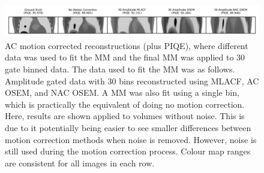             \begin{figure}
                \centering
                
                \includegraphics[width=1.0\linewidth]{figures/motion_correction_2_results_2_noiseless_30_amplitude_visual_analysis.png}
                
                \captionsetup{singlelinecheck=false}
                \caption{
                    \gls{AC} motion corrected reconstructions (plus \gls{PIQE}), where different data was used to fit the \gls{MM} and the final \gls{MM} was applied to $30$ gate binned data. The data used to fit the \gls{MM} was as follows. Amplitude gated data with $30$ bins reconstructed using \gls{MLACF}, \gls{AC} \gls{OSEM}, and \gls{NAC} \gls{OSEM}. A \gls{MM} was also fit using a single bin, which is practically the equivalent of doing no motion correction. Here, results are shown applied to volumes without noise. This is due to it potentially being easier to see smaller differences between motion correction methods when noise is removed. However, noise is still used during the motion correction process. Colour map ranges are consistent for all images in each row.
                }
                
                \label{fig:evaluation_of_pet_ct_motion_correction_incorporating_motion_models_using_mlacf_and_complex_gating_schemes_results_noiseless_30_amplitude_visual_analysis}
            \end{figure}

